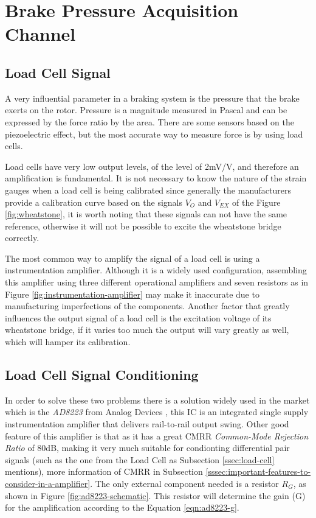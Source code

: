 \section{Brake Pressure Acquisition Channel}\label{sec:brake-pressure-acquisition-channel}

\subsection{Load Cell Signal}\label{ssec:load-cell-signal}

	A very influential parameter in a braking system is the pressure that the brake exerts on the rotor. Pressure is a magnitude measured in Pascal and can be expressed by the force ratio by the area. There are some sensors based on the piezoelectric effect, but the most accurate way to measure force is by using load cells.

	Load cells have very low output levels, of the level of 2mV/V, and therefore an amplification is fundamental. It is not necessary to know the nature of the strain gauges when a load cell is being calibrated since generally the manufacturers provide a calibration curve based on the signals $V_{O}$ and $V_{EX}$ of the Figure \ref{fig:wheatstone}, it is worth noting that these signals can not have the same reference, otherwise it will not be possible to excite the wheatstone bridge correctly. 

	The most common way to amplify the signal of a load cell is using a instrumentation amplifier. Although it is a widely used configuration, assembling this amplifier using three different operational amplifiers and seven resistors as in Figure \ref{fig:instrumentation-amplifier} may make it inaccurate due to manufacturing imperfections of the components. Another factor that greatly influences the output signal of a load cell is the excitation voltage of its wheatstone bridge, if it varies too much the output will vary greatly as well, which will hamper its calibration.

\subsection{Load Cell Signal Conditioning}\label{ssec:load-cell-signal-conditioning}
		
	In order to solve these two problems there is a solution widely used in the market which is the \textit{AD8223} from Analog Devices \cite{ad8223-datasheet}, this IC is an integrated single supply instrumentation amplifier that delivers rail-to-rail output swing. Other good feature of this amplifier is that as it has a great CMRR \textit{Common-Mode Rejection Ratio} of 80dB, making it very much suitable for condionting differential pair signals (such as the one from the Load Cell as Subsection \ref{ssec:load-cell} mentions), more information of CMRR in Subsection \ref{sssec:important-features-to-consider-in-a-amplifier}. The only external component needed is a resistor $R_{G}$, as shown in Figure \ref{fig:ad8223-schematic}. This resistor will determine the gain (G) for the amplification according to the Equation \ref{eqn:ad8223-g}.
	

